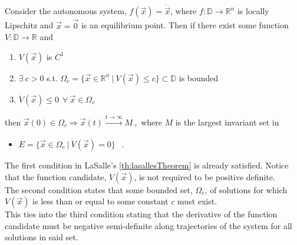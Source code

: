 \begin{minipage}[]{\linewidth}
  \begin{theorem}
    \label{th:lasallesTheorem}
    Consider the autonomous system, $f(\vec{x}) = \dot{\vec{x}}$, where $f : \mathbb{D} \rightarrow \mathbb{R} ^n$ is locally Lipschitz and $\vec{x}=\vec{0}$ is an equilibrium point. Then if there exist some function $V : \mathbb{D} \rightarrow \mathbb{R}$ and
    \begin{enumerate}
      \item $V(\vec{x})$ is $C^1$
      \item $\exists\ c > 0$ s.t. $\Omega_c = \{\vec{x} \in \mathbb{R}^n \ | \ V(\vec{x}) \leq c \} \subset \mathbb{D}$ is bounded
      \item $\dot{V}(\vec{x}) \leq 0 \ \ \forall \ \vec{x} \in \Omega_c$
    \end{enumerate}
    then $\vec{x}(0) \in \Omega_c \Rightarrow \vec{x}(t) \xrightarrow[]{t \to \infty} M \ ,$  where $M$ is the largest invariant set in
    \begin{itemize}
      \item[] $E = \{ \vec{x} \in \Omega_c \ | \ \dot{V}(\vec{x}) = 0 \} \ \ $ \cite{HKKhalil}.
    \end{itemize}
  \end{theorem}
\end{minipage}
%
The first condition in LaSalle's \autoref{th:lasallesTheorem} is already satisfied. Notice that the function candidate, $V(\vec{x})$, is not required to be positive definite.\\
The second condition states that some bounded set, $\Omega_c$, of solutions for which $V(\vec{x})$ is less than or equal to some constant $c$ must exist.\\
This ties into the third condition stating that the derivative of the function candidate must be negative semi-definite along trajectories of the system for all solutions in said set.\\
